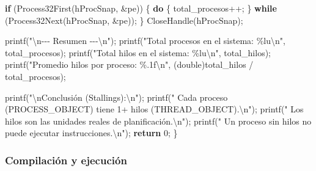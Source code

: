 \documentclass[
  spanish,
]{article}
\newenvironment{Shaded}{}{}
\newcommand{\ControlFlowTok}[1]{\textcolor[rgb]{0.00,0.44,0.13}{\textbf{#1}}}
\newcommand{\DataTypeTok}[1]{\textcolor[rgb]{0.56,0.13,0.00}{#1}}
\newcommand{\DecValTok}[1]{\textcolor[rgb]{0.25,0.63,0.44}{#1}}
\newcommand{\NormalTok}[1]{#1}
\newcommand{\OperatorTok}[1]{\textcolor[rgb]{0.40,0.40,0.40}{#1}}
\newcommand{\SpecialCharTok}[1]{\textcolor[rgb]{0.25,0.44,0.63}{#1}}
\newcommand{\StringTok}[1]{\textcolor[rgb]{0.25,0.44,0.63}{#1}}
\begin{document}
\begin{Shaded}
\begin{Highlighting}[]
    \ControlFlowTok{if} \OperatorTok{(}\NormalTok{Process32First}\OperatorTok{(}\NormalTok{hProcSnap}\OperatorTok{,} \OperatorTok{\&}\NormalTok{pe}\OperatorTok{))} \OperatorTok{\{}
        \ControlFlowTok{do} \OperatorTok{\{}\NormalTok{ total\_procesos}\OperatorTok{++;} \OperatorTok{\}} \ControlFlowTok{while} \OperatorTok{(}\NormalTok{Process32Next}\OperatorTok{(}\NormalTok{hProcSnap}\OperatorTok{,} \OperatorTok{\&}\NormalTok{pe}\OperatorTok{));}
    \OperatorTok{\}}
\NormalTok{    CloseHandle}\OperatorTok{(}\NormalTok{hProcSnap}\OperatorTok{);}

\NormalTok{    printf}\OperatorTok{(}\StringTok{"}\SpecialCharTok{\textbackslash{}n}\StringTok{{-}{-}{-} Resumen {-}{-}{-}}\SpecialCharTok{\textbackslash{}n}\StringTok{"}\OperatorTok{);}
\NormalTok{    printf}\OperatorTok{(}\StringTok{"Total procesos en el sistema: }\SpecialCharTok{\%lu\textbackslash{}n}\StringTok{"}\OperatorTok{,}\NormalTok{ total\_procesos}\OperatorTok{);}
\NormalTok{    printf}\OperatorTok{(}\StringTok{"Total hilos en el sistema:    }\SpecialCharTok{\%lu\textbackslash{}n}\StringTok{"}\OperatorTok{,}\NormalTok{ total\_hilos}\OperatorTok{);}
\NormalTok{    printf}\OperatorTok{(}\StringTok{"Promedio hilos por proceso:   }\SpecialCharTok{\%.1f\textbackslash{}n}\StringTok{"}\OperatorTok{,}
           \OperatorTok{(}\DataTypeTok{double}\OperatorTok{)}\NormalTok{total\_hilos }\OperatorTok{/}\NormalTok{ total\_procesos}\OperatorTok{);}

\NormalTok{    printf}\OperatorTok{(}\StringTok{"}\SpecialCharTok{\textbackslash{}n}\StringTok{Conclusión (Stallings):}\SpecialCharTok{\textbackslash{}n}\StringTok{"}\OperatorTok{);}
\NormalTok{    printf}\OperatorTok{(}\StringTok{"  Cada proceso (PROCESS\_OBJECT) tiene 1+ hilos (THREAD\_OBJECT).}\SpecialCharTok{\textbackslash{}n}\StringTok{"}\OperatorTok{);}
\NormalTok{    printf}\OperatorTok{(}\StringTok{"  Los hilos son las unidades reales de planificación.}\SpecialCharTok{\textbackslash{}n}\StringTok{"}\OperatorTok{);}
\NormalTok{    printf}\OperatorTok{(}\StringTok{"  Un proceso \textquotesingle{}sin hilos\textquotesingle{} no puede ejecutar instrucciones.}\SpecialCharTok{\textbackslash{}n}\StringTok{"}\OperatorTok{);}
    \ControlFlowTok{return} \DecValTok{0}\OperatorTok{;}
\OperatorTok{\}}
\end{Highlighting}
\end{Shaded}

\subsubsection{Compilación y
ejecución}\label{compilaciuxf3n-y-ejecuciuxf3n-6}
\end{document}
